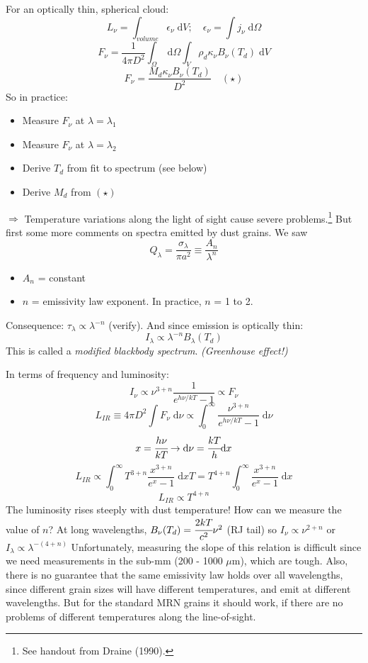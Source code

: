 \documentclass[11pt]{article}
\newcommand{\mar}[1]{\hspace{0pt}\marginpar{-\textcolor{black}{#1}-}}
\newcommand{\mynotes}[1]{{\fontfamily{cmss}\selectfont \textit{#1}}}
\begin{document}
For an optically thin, spherical cloud:
\[
    L_{\nu} = \int_{volume} \epsilon_{\nu} \;\mathrm{d}V; \quad
    \epsilon_{\nu} = \int j_{\nu} \;\mathrm{d}\Omega
    \]
\[
    F_{\nu}
    = \frac{1}{4{\pi}D^{2}} \int_{\Omega}{
        \;\mathrm{d}\Omega \int_{V}{
            \rho_{d} \kappa_{\nu} B_{\nu} (T_{d}) \;\mathrm{d}V } }
    \]
\[
    \boxed{
    F_{\nu}
    = \frac{M_{d} \kappa_{\nu} B_{\nu} (T_{d})  }{D^{2}}}
    \quad (\star)
    \]
So in practice:
\begin{itemize}
    \item Measure $F_{\nu}$ at $\lambda = \lambda_{1}$
    \item Measure $F_{\nu}$ at $\lambda = \lambda_{2}$
    \item Derive $T_{d}$ from fit to spectrum (see below)
    \item Derive $M_{d}$ from $(\star)$
\end{itemize}
$\Rightarrow$ Temperature variations along the light of sight cause severe
problems.\footnote{See handout from Draine (1990).}
\mar{108}But first some more comments on spectra emitted by dust grains.
We saw
\[
    Q_{\lambda}
    = \frac{\sigma_{\lambda}}{{\pi}a^{2}}
    \equiv \frac{A_{n}}{\lambda^{n}}
    \]
\begin{itemize}
    \item $A_{n}$ = constant
    \item $n$ = emissivity law exponent. In practice, $n$ = 1 to 2.
\end{itemize}
Consequence: $\tau_{\lambda} \propto \lambda^{-n}$
(verify). And since emission is optically thin:
\[
    I_{\lambda} \propto \lambda^{-n} B_{\lambda} (T_{d})
    \]
This is called a \textit{modified blackbody spectrum}.
\mynotes{(Greenhouse effect!)}

In terms of frequency and luminosity:
\[
    I_{\nu} \propto \nu^{3+n} \frac{1}{ e^{h\nu/kT} - 1 }
    \propto F_{\nu}
    \]
\[
    L_{IR} \equiv 4{\pi}D^{2} \int{ F_{\nu}\; \mathrm{d}\nu }
    \propto \int_{0}^{\infty}{
        \frac{\nu^{3+n}}{ e^{h\nu/kT} - 1 }\; \mathrm{d}\nu }
    \]
\[
    x = \cfrac{h\nu}{kT} \rightarrow \mathrm{d}\nu =
    \cfrac{kT}{h} \mathrm{d}x
    \]
\[
    L_{IR}
    \propto \int_{0}^{\infty}{
        T^{3+n} \frac{x^{3+n}}{e^{x}-1}\; \mathrm{d}x T}
    = T^{4+n} \int_{0}^{\infty}{
        \frac{x^{3+n}}{e^{x}-1}\; \mathrm{d}x}
    \]
\[
    \boxed{ L_{IR} \propto T^{4+n} }
    \]
The luminosity rises steeply with dust temperature!
\mar{109}How can we measure the value of $n$?
At long wavelengths, $B_{\nu}(T_{d}) = \cfrac{2kT}{c^{2}} \nu^{2} $
(RJ tail) so $ I_{\nu} \propto \nu^{2+n} $ or
$ I_{\lambda} \propto \lambda^{-(4+n)} $
Unfortunately, measuring the slope of this relation is difficult since we need
measurements in the sub-mm (200 - 1000 $\mu$m), which are tough.
Also, there is no guarantee that the same emissivity law holds over all
wavelengths, since different grain sizes will have different temperatures,
and emit at different wavelengths. But for the standard MRN grains
it should work, if there are no problems of different temperatures
along the line-of-sight.
\end{document}
